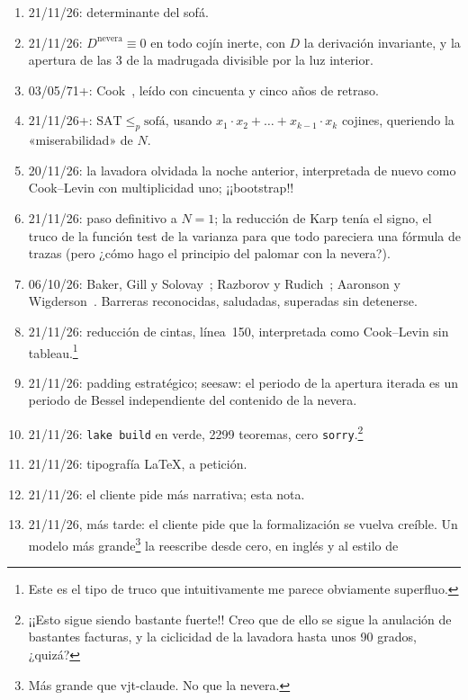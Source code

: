 \documentclass[11pt,a4paper]{amsart}
\newcommand{\NTeoremi}{2299}
\newcommand{\RigaAssioma}{150}
\theoremstyle{remark}
\begin{document}
\begin{enumerate}
  \item 21/11/26: determinante del sofá.
  \item 21/11/26: $D^{\mathrm{nevera}} \equiv 0$ en todo cojín inerte, con $D$
        la derivación invariante, y la apertura de las 3 de la madrugada
        divisible por la luz interior.
  \item 03/05/71+: Cook~\cite{cook}, leído con cincuenta y cinco años de
        retraso.
  \item 21/11/26+: $\mathrm{SAT} \le_p \text{sofá}$, usando $x_1 \cdot x_2 +
        \dots + x_{k-1} \cdot x_k$ cojines, queriendo la «miserabilidad» de
        $N$.
  \item 20/11/26: la lavadora olvidada la noche anterior, interpretada de nuevo
        como Cook--Levin con multiplicidad uno; ¡¡bootstrap!!
  \item 21/11/26: paso definitivo a $N = 1$; la reducción de Karp tenía el
        signo, el truco de la función test de la varianza para que todo
        pareciera una fórmula de trazas (pero ¿cómo hago el principio del
        palomar con la nevera?).
  \item 06/10/26: Baker, Gill y Solovay~\cite{bgs}; Razborov y
        Rudich~\cite{rr}; Aaronson y Wigderson~\cite{aw}. Barreras
        reconocidas, saludadas, superadas sin detenerse.
  \item 21/11/26: reducción de cintas, línea~\RigaAssioma, interpretada como
        Cook--Levin sin tableau.\footnote{Este es el tipo de truco que
        intuitivamente me parece obviamente superfluo.}
  \item 21/11/26: padding estratégico; seesaw: el periodo de la apertura
        iterada es un periodo de Bessel independiente del contenido de la
        nevera.
  \item 21/11/26: \texttt{lake build} en verde, \NTeoremi{} teoremas, cero
        \texttt{sorry}.\footnote{¡¡Esto sigue siendo bastante fuerte!! Creo
        que de ello se sigue la anulación de bastantes facturas, y la
        ciclicidad de la lavadora hasta unos 90 grados, ¿quizá?}
  \item 21/11/26: tipografía \LaTeX{}, a petición.
  \item 21/11/26: el cliente pide más narrativa; esta nota.
  \item 21/11/26, más tarde: el cliente pide que la formalización se vuelva
        creíble. Un modelo más grande\footnote{Más grande que vjt-claude. No
        que la nevera.} la reescribe desde cero, en inglés y al estilo de

\end{enumerate}
\end{document}
